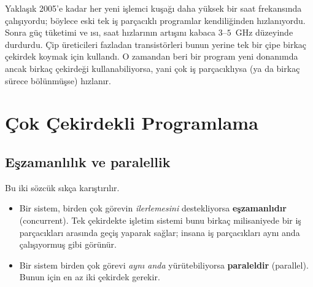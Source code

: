 \documentclass[11pt,a4paper]{article}
\newcommand{\term}[1]{\textbf{\color{mintdeep}#1}}
\begin{document}
\begin{histnote}
Yaklaşık 2005'e kadar her yeni işlemci kuşağı daha yüksek bir saat frekansında çalışıyordu; böylece eski tek iş parçacıklı programlar kendiliğinden hızlanıyordu. Sonra güç tüketimi ve ısı, saat hızlarının artışını kabaca $3$--$5$~GHz düzeyinde durdurdu. Çip üreticileri fazladan transistörleri bunun yerine tek bir çipe birkaç çekirdek koymak için kullandı. O zamandan beri bir program yeni donanımda ancak birkaç çekirdeği kullanabiliyorsa, yani çok iş parçacıklıysa (ya da birkaç sürece bölünmüşse) hızlanır.
\end{histnote}

\section{Çok Çekirdekli Programlama}

\subsection{Eşzamanlılık ve paralellik}

Bu iki sözcük sıkça karıştırılır.

\begin{itemize}
  \item Bir sistem, birden çok görevin \emph{ilerlemesini} destekliyorsa \term{eşzamanlıdır} (concurrent). Tek çekirdekte işletim sistemi bunu birkaç milisaniyede bir iş parçacıkları arasında geçiş yaparak sağlar; insana iş parçacıkları aynı anda çalışıyormuş gibi görünür.
  \item Bir sistem birden çok görevi \emph{aynı anda} yürütebiliyorsa \term{paraleldir} (parallel). Bunun için en az iki çekirdek gerekir.
\end{itemize}
\end{document}
